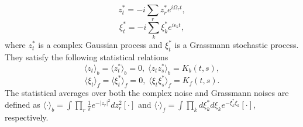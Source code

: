 \documentclass[preprint]{elsarticle}
\begin{document}
\begin{equation}
z_{t}^{*}=-i\sum_{r}z_{r}^{*}e^{i\Omega_{r}t},
\end{equation}
\begin{equation}
\xi_{t}^{*}=-i\sum_{k}\xi_{k}^{*}e^{i\epsilon_{k}t},
\end{equation}
where $z_{t}^{*}$ is a complex Gaussian process and $\xi_{t}^{*}$
is a Grassmann stochastic process. They satisfy the following statistical relations
\begin{equation}
\langle z_{t}\rangle_{b}=\langle z_{t}^{*}\rangle_{b}=0,\;\langle z_{t}z_{s}^{*}\rangle_{b}=K_{b}(t,s),
\end{equation}
\begin{equation}
\langle\xi_{t}\rangle_{f}=\langle\xi_{t}^{*}\rangle_{f}=0,\;\langle\xi_{t}\xi_{s}^{*}\rangle_{f}=K_{f}(t,s).
\end{equation}
The statistical averages over  both the complex noise and Grassmann noises  are
defined as $\langle\cdot\rangle_{b}=\int\prod_{r}\frac{1}{\pi}e^{-|z_{r}|^{2}}dz_{r}^{2}[\cdot]$
and $\langle\cdot\rangle_{f}=\int\prod_{k}d\xi_{k}^{*}d\xi_{k}e^{-\xi_{k}^{*}\xi_{k}}[\cdot]$,
respectively.
\end{document}
